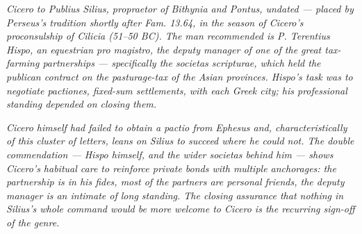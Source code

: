 
\textit{Cicero to Publius Silius, propraetor of Bithynia
and Pontus, undated --- placed by Perseus's tradition
shortly after \textit{Fam.} 13.64, in the season of
Cicero's proconsulship of Cilicia (51--50 BC). The man
recommended is P. Terentius Hispo, an equestrian
\textit{pro magistro}, the deputy manager of one of the
great tax-farming partnerships --- specifically the
\textit{societas scripturae}, which held the publican
contract on the pasturage-tax of the Asian provinces.
Hispo's task was to negotiate \textit{pactiones},
fixed-sum settlements, with each Greek city; his
professional standing depended on closing them.}

\textit{Cicero himself had failed to obtain a
\textit{pactio} from Ephesus and, characteristically of
this cluster of letters, leans on Silius to succeed where
he could not. The double commendation --- Hispo himself,
and the wider \textit{societas} behind him --- shows
Cicero's habitual care to reinforce private bonds with
multiple anchorages: the partnership is in his
\textit{fides}, most of the partners are personal
friends, the deputy manager is an intimate of long
standing. The closing assurance that nothing in Silius's
whole command would be more welcome to Cicero is the
recurring sign-off of the genre.}
